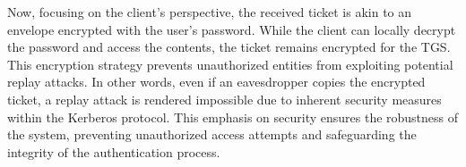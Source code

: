 Now, focusing on the client's perspective, the received ticket is akin to an envelope encrypted with the user's password. While the client can locally decrypt the password and access the contents, the ticket remains encrypted for the TGS. This encryption strategy prevents unauthorized entities from exploiting potential replay attacks. In other words, even if an eavesdropper copies the encrypted ticket, a replay attack is rendered impossible due to inherent security measures within the Kerberos protocol. This emphasis on security ensures the robustness of the system, preventing unauthorized access attempts and safeguarding the integrity of the authentication process.
